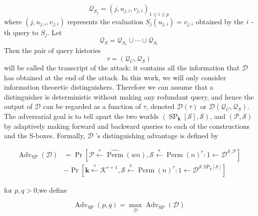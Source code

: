 $$
\mathcal{Q}_{S_j} = (j, u_{j,i}, v_{j,i})_{1 \leq i \leq p}
$$
where $(j, u_{j,i}, v_{j,i})$  represents the evaluation $S_j(u_{j,i}) = v_{j,i}$ obtained by the $\mathnormal{i}$ -th query to $S_j$. Let
$$
\mathcal{Q}_{S}=\mathcal{Q}_{S_1} \cup \cdots \cup \mathcal{Q}_{S_r}
$$
Then the pair of query histories
$$
\tau = (\mathcal{Q}_{C}, \mathcal{Q}_{S})
$$
will be called the transcript of the attack: it contains all the information that  $\mathcal{D}$ has obtained at the end of the attack. In this work, we will only consider
information theoretic distinguishers. Therefore we can assume that a distinguisher is deterministic without making any redundant query, and hence the output of  $\mathcal{D}$  can be regarded as a function of $\tau$, denoted $\mathcal{D}(\tau)$ or $\mathcal{D}(\mathcal{Q}_C, \mathcal{Q}_S)$.\\

The adversarial goal is to tell apart the two worlds $\left(\operatorname{SP}_{\mathbf{k}}[\mathcal{S}],\mathcal{S}\right)$, and $\left(\mathcal{P},\mathcal{S}\right)$ by adaptively making forward and backward queries to each of the constructions and the S-boxes. Formally, $\mathcal{D}$ 's distinguishing advantage is defined by

\begin{equation}
\begin{aligned}
\operatorname{Adv}_{\mathrm{SP}}(\mathcal{D}) &=\operatorname{Pr}\left[\mathcal{P} \stackrel{s}{\leftarrow} \widehat{\operatorname{Perm}}(w n), \mathcal{S} \stackrel{\mathrm{s}}{\leftarrow} \operatorname{Perm}(n)^{r}: 1 \leftarrow \mathcal{D}^{\mathcal{S},\mathcal{P}}\right] \\
&-\operatorname{Pr}\left[\mathbf{k} \stackrel{s}{\leftarrow} \mathcal{K}^{r+1}, \mathcal{S} \stackrel{\mathrm{s}}{\leftarrow} \operatorname{Perm}(n)^{r}: 1 \leftarrow \mathcal{D}^{\mathcal{S}, \mathrm{SP}_{\mathrm{k}}[\mathcal{S}]}\right]
\end{aligned}
\end{equation}

for $p,q > 0$,we define

$$
\operatorname{Adv}_{\mathrm{SP}}(p, q)=\max _{\mathcal{D}} \operatorname{Adv}_{\mathrm{SP}}(\mathcal{D})
$$

